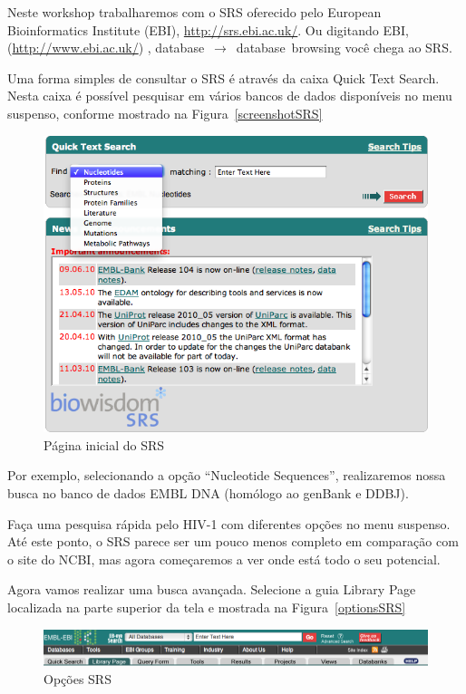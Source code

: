 \documentclass[letter,11pt]{book}
\begin{document}
Neste workshop trabalharemos com o SRS oferecido pelo European Bioinformatics Institute (EBI), \url{http://srs.ebi.ac.uk/}. Ou digitando EBI, (\url{http://www.ebi.ac.uk/}) , database~$\rightarrow$~database~browsing você chega ao SRS. 

Uma forma simples de consultar o SRS é através da caixa Quick Text Search. Nesta caixa é possível pesquisar em vários bancos de dados disponíveis no menu suspenso, conforme mostrado na Figura~\ref{screenshotSRS} 

\begin{figure}[ht]
\centering
   \includegraphics[width=15cm]{Figs/screenshorSRS.png}
  \caption{\label{screenshoteSRS}Página inicial do SRS}
\end{figure}

Por exemplo, selecionando a opção “Nucleotide Sequences”, realizaremos nossa busca no banco de dados EMBL DNA (homólogo ao genBank e DDBJ). 

Faça uma pesquisa rápida pelo HIV-1 com diferentes opções no menu suspenso. Até este ponto, o SRS parece ser um pouco menos completo em comparação com o site do NCBI, mas agora começaremos a ver onde está todo o seu potencial.

Agora vamos realizar uma busca avançada. Selecione a guia Library Page localizada na parte superior da tela e mostrada na Figura~\ref{optionsSRS} 

\begin{figure}[ht]
\centering
   \includegraphics[width=15cm]{Figs/SRSMenu.png}
  \caption{\label{opcionesSRS}Opções SRS}
\end{figure}
\end{document}
